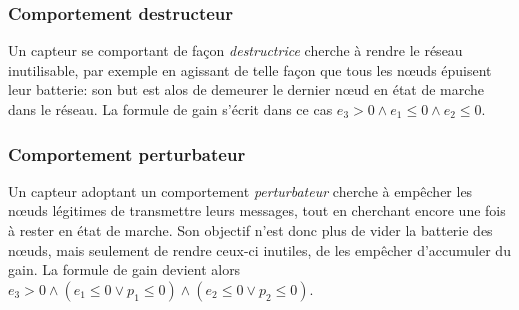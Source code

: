         \subsubsection{Comportement destructeur}
Un capteur se comportant de façon \emph{destructrice} cherche à rendre le réseau inutilisable, par exemple en agissant de telle façon que tous les nœuds épuisent leur batterie: son but est alos de demeurer le dernier nœud en état de marche dans le réseau.
La formule de gain s'écrit dans ce cas $e_3 >0 \wedge e_1 \leq 0 \wedge e_2 \leq 0$.

        \subsubsection{Comportement perturbateur}
Un capteur adoptant un comportement \emph{perturbateur} cherche à empêcher les nœuds légitimes de transmettre leurs messages, tout en cherchant encore une fois à rester en état de marche.
Son objectif n'est donc plus de vider la batterie des nœuds, mais seulement de rendre ceux-ci inutiles, de les empêcher d'accumuler du gain.
La formule de gain devient alors $e_3 >0 \wedge (e_1 \leq 0 \vee p_1\leq0) \wedge (e_2 \leq 0 \vee p_2\leq0)$.
